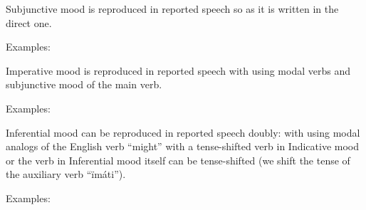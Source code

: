 Subjunctive mood is reproduced in reported speech so as it is written in the direct one. 

Examples:


Imperative mood is reproduced in reported speech with using modal verbs and subjunctive mood of the main verb.

Examples:

Inferential mood can be reproduced in reported speech doubly: with using modal analogs of the English verb “might” with a tense-shifted verb in Indicative mood or the verb in Inferential mood itself can be tense-shifted (we shift the tense of the auxiliary verb “ïmáti”).

Examples: 
